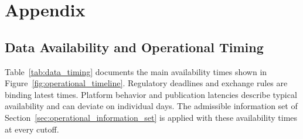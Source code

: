 \clearpage
\appendix
\renewcommand{\thesubsection}{\thesection\arabic{subsection}}
\section*{Appendix \thesection}
\label{app:additional_material}

\renewcommand{\thetable}{\thesection\arabic{table}}
\renewcommand{\thefigure}{\thesection\arabic{figure}}
\setcounter{table}{0}
\setcounter{figure}{0}

\subsection{Data Availability and Operational Timing}
\label{app:data_timing}

Table~\ref{tab:data_timing} documents the main availability times shown in
Figure~\ref{fig:operational_timeline}. Regulatory deadlines and exchange rules
are binding latest times. Platform behavior and publication latencies describe
typical availability and can deviate on individual days. The admissible
information set of Section~\ref{sec:operational_information_set} is applied
with these availability times at every cutoff.

